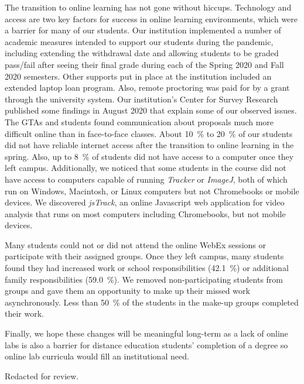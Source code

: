 \documentclass[aip, numerical, preprint]{revtex4-2}
\begin{document}
The transition to online learning has not gone without hiccups.  Technology and access are two
key factors for success in online learning environments, which were a barrier for many of our
students.  Our institution implemented a number of academic measures intended to support our
students during the pandemic, including extending the withdrawal date and allowing students to
be graded pass/fail after seeing their final grade during each of the Spring 2020 and Fall 2020
semesters. Other supports put in place at the institution included an extended laptop loan
program. Also, remote proctoring was paid for by a grant through the university system. Our
institution's Center for Survey Research published some findings in August 2020 that explain
some of our observed issues.\citep{ECUcovidSurveyRedacted} The GTAs and students found
communication about proposals much more difficult online than in face-to-face classes.  About
\SI{10}{\percent} to \SI{20}{\percent} of our students did not have reliable internet access
after the transition to online learning in the spring.\citep{ECUcovidSurveyRedacted} Also, up
to \SI{8}{\percent} of students did not have access to a computer once they left
campus.\citep{ECUcovidSurveyRedacted} Additionally, we noticed that some students in the course
did not have access to computers capable of running \emph{Tracker} or \emph{ImageJ}, both of
which run on Windows, Macintosh, or Linux computers but not Chromebooks or mobile devices. We
discovered \emph{jsTrack}\citep{jstrack}, an online Javascript web application for video
analysis that runs on most computers including Chromebooks, but not mobile devices.

Many students could not or did not attend the online WebEx sessions or participate with their
assigned groups.  Once they left campus, many students found they had increased work or school
responsibilities (\SI{42.1}{\percent}) or additional family responsibilities
(\SI{59.0}{\percent}).\citep{ECUcovidSurveyRedacted} We removed non-participating students from
groups and gave them an opportunity to make up their missed work asynchronously. Less than
\SI{50}{\percent} of the students in the make-up groups completed their work.

Finally, we hope these changes will be meaningful long-term as a lack of online labs is also a
barrier for distance education students' completion of a degree so online lab curricula would
fill an institutional need.


\begin{acknowledgments}
  Redacted for review.%
\end{acknowledgments}


\end{document}
